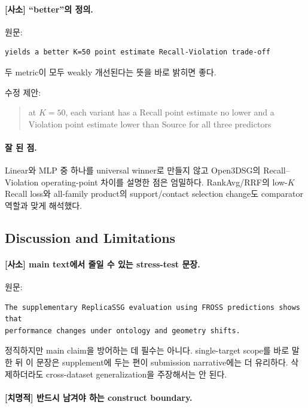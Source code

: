 \documentclass[11pt]{article}
\newcommand{\fatal}{\textbf{\textcolor{fatalred}{[치명적]}}}
\newcommand{\minor}{\textbf{\textcolor{minorblue}{[사소]}}}
\begin{document}
\paragraph{\minor{} ``better''의 정의.}

원문:
\begin{verbatim}
yields a better K=50 point estimate Recall-Violation trade-off
\end{verbatim}

두 metric이 모두 weakly 개선된다는 뜻을 바로 밝히면 좋다.

수정 제안:
\begin{quote}
at $K=50$, each variant has a Recall point estimate no lower and a Violation
point estimate lower than Source for all three predictors
\end{quote}

\paragraph{잘 된 점.}

Linear와 MLP 중 하나를 universal winner로 만들지 않고 Open3DSG의 Recall--Violation
operating-point 차이를 설명한 점은 엄밀하다. RankAvg/RRF의 low-$K$ Recall loss와
all-family product의 support/contact selection change도 comparator 역할과 맞게
해석했다.

\subsection{Discussion and Limitations}

\paragraph{\minor{} main text에서 줄일 수 있는 stress-test 문장.}

원문:
\begin{verbatim}
The supplementary ReplicaSSG evaluation using FROSS predictions shows that
performance changes under ontology and geometry shifts.
\end{verbatim}

정직하지만 main claim을 방어하는 데 필수는 아니다. single-target scope를 바로
말한 뒤 이 문장은 supplement에 두는 편이 submission narrative에는 더 유리하다.
삭제하더라도 cross-dataset generalization을 주장해서는 안 된다.

\paragraph{\fatal{} 반드시 남겨야 하는 construct boundary.}
\end{document}
